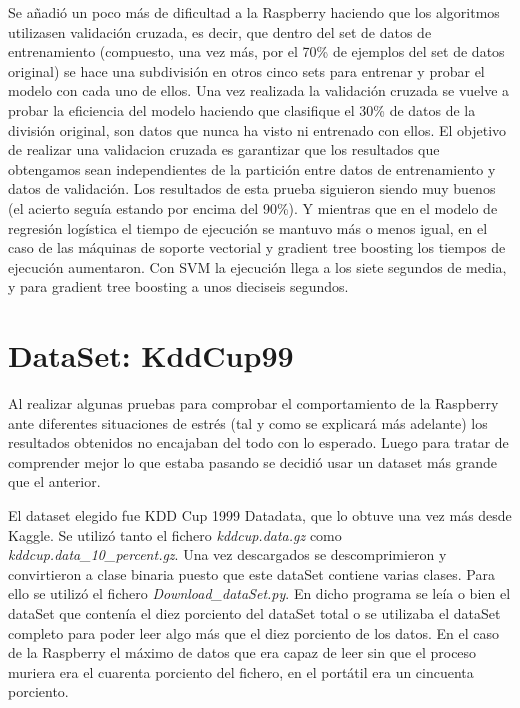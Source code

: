 \documentclass[a4paper, 12pt]{book}
\begin{document}
Se añadió un poco más de dificultad a la Raspberry haciendo que los algoritmos utilizasen validación cruzada, es decir, que dentro del set de datos de entrenamiento (compuesto, una vez más, por el 70\% de ejemplos del set de datos original) se hace una subdivisión en otros cinco sets para entrenar y probar el modelo con cada uno de ellos. 
Una vez realizada la validación cruzada se vuelve a probar la eficiencia del modelo haciendo que clasifique el 30\% de datos de la división original, son datos que nunca ha visto ni entrenado con ellos. El objetivo de realizar una validacion cruzada es garantizar que los resultados que obtengamos sean independientes de la partición entre datos de entrenamiento y datos de validación. Los resultados de esta prueba siguieron siendo muy buenos (el acierto seguía estando por encima del 90\%). Y mientras que en el modelo de regresión logística el tiempo de ejecución se mantuvo más o menos igual, en el caso de las máquinas de soporte vectorial y gradient tree boosting los tiempos de ejecución aumentaron. Con SVM la ejecución llega a los siete segundos de media, y para gradient tree boosting a unos dieciseis segundos.


\section{DataSet: KddCup99}

Al realizar algunas pruebas para comprobar el comportamiento de la Raspberry ante diferentes situaciones de estrés (tal y como se explicará más adelante) los resultados obtenidos no encajaban del todo con lo esperado. Luego para tratar de comprender mejor lo que estaba pasando se decidió usar un dataset más grande que el anterior.

El dataset elegido fue KDD Cup 1999 Datadata\cite{DataSetOccupancy}, que lo obtuve una vez más desde Kaggle. Se utilizó tanto el fichero \textit{kddcup.data.gz} como \textit{kddcup.data\_10\_percent.gz}. Una vez descargados se descomprimieron y convirtieron a clase binaria puesto que este dataSet contiene varias clases. 
Para ello se utilizó el fichero \textit{Download\_dataSet.py}. En dicho programa se leía o bien el dataSet que contenía el diez porciento del dataSet total o se utilizaba el dataSet completo para poder leer algo más que el diez porciento de los datos. En el caso de la Raspberry el máximo de datos que era capaz de leer sin que el proceso muriera era el cuarenta porciento del fichero, en el portátil era un cincuenta porciento.
\end{document}
